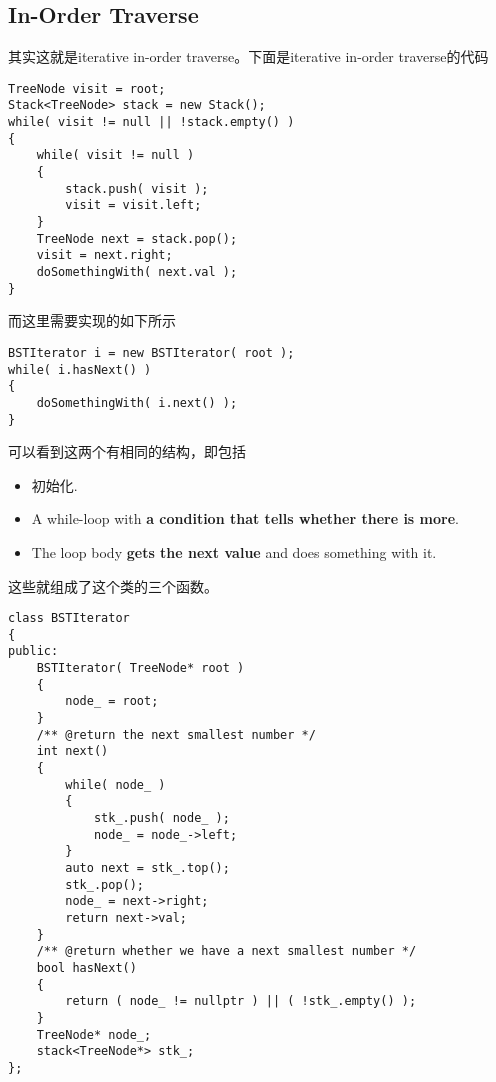 \subsection{In-Order Traverse}
其实这就是iterative in-order traverse。下面是iterative in-order traverse的代码
\begin{lstlisting}[style=customc]
TreeNode visit = root;
Stack<TreeNode> stack = new Stack();
while( visit != null || !stack.empty() )
{
    while( visit != null )
    {
        stack.push( visit );
        visit = visit.left;
    }
    TreeNode next = stack.pop();
    visit = next.right;
    doSomethingWith( next.val );
}
\end{lstlisting}
而这里需要实现的如下所示
\begin{lstlisting}[style=customc]
BSTIterator i = new BSTIterator( root );
while( i.hasNext() )
{
    doSomethingWith( i.next() );
}
\end{lstlisting}
可以看到这两个有相同的结构，即包括
\begin{itemize}
\item 初始化.
\item A while-loop with \textbf{a condition that tells whether there is more}.
\item The loop body \textbf{gets the next value} and does something with it.
\end{itemize}
这些就组成了这个类的三个函数。

\setcounter{lstlisting}{0}
\begin{lstlisting}[style=customc, caption={Stack}]
class BSTIterator
{
public:
    BSTIterator( TreeNode* root )
    {
        node_ = root;
    }
    /** @return the next smallest number */
    int next()
    {
        while( node_ )
        {
            stk_.push( node_ );
            node_ = node_->left;
        }
        auto next = stk_.top();
        stk_.pop();
        node_ = next->right;
        return next->val;
    }
    /** @return whether we have a next smallest number */
    bool hasNext()
    {
        return ( node_ != nullptr ) || ( !stk_.empty() );
    }
    TreeNode* node_;
    stack<TreeNode*> stk_;
};
\end{lstlisting}